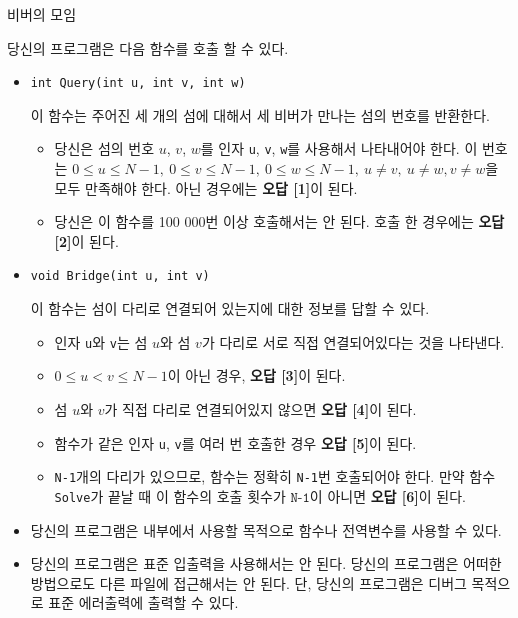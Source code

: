 \begin{problem}{비버의 모임}
\begin{itemize}
		당신의 프로그램은 다음 함수를 호출 할 수 있다.
		\begin{itemize}
			\item \texttt{int Query(int u, int v, int w)}
			
			이 함수는 주어진 세 개의 섬에 대해서 세 비버가 만나는 섬의 번호를 반환한다.
			
			\begin{itemize}
				\item 당신은 섬의 번호 $u$, $v$, $w$를 인자 \texttt{u}, \texttt{v}, \texttt{w}를 사용해서 나타내어야 한다. 이 번호는 $0 \le u \le N-1,\ 0 \le v \le N-1, \ 0 \le w \le N-1, \ u \ne v, \ u \ne w , v \ne w$을 모두 만족해야 한다. 아닌 경우에는 \textbf{오답 [1]}이 된다.
				
				\item 당신은 이 함수를 100 000번 이상 호출해서는 안 된다. 호출 한 경우에는 \textbf{오답 [2]}이 된다.
			\end{itemize}
		
			\item \texttt{void Bridge(int u, int v)}
			
			이 함수는 섬이 다리로 연결되어 있는지에 대한 정보를 답할 수 있다.
			
			\begin{itemize}
				\item 인자 \texttt{u}와 \texttt{v}는 섬 $u$와 섬 $v$가 다리로 서로 직접 연결되어있다는 것을 나타낸다.
				\item $0 \le u < v \le N-1$이 아닌 경우, \textbf{오답 [3]}이 된다.
				\item 섬 $u$와 $v$가 직접 다리로 연결되어있지 않으면 \textbf{오답 [4]}이 된다.
				\item 함수가 같은 인자 \texttt{u}, \texttt{v}를 여러 번 호출한 경우 \textbf{오답 [5]}이 된다.
				\item \texttt{N-1}개의 다리가 있으므로, 함수는 정확히 \texttt{N-1}번 호출되어야 한다. 만약 함수 \texttt{Solve}가 끝날 때 이 함수의 호출 횟수가 $\texttt{N-1}$이 아니면 \textbf{오답 [6]}이 된다.
			\end{itemize}
		\end{itemize}
	
	
	\end{itemize}

	\Notes

	\begin{itemize}
		\item 당신의 프로그램은 내부에서 사용할 목적으로 함수나 전역변수를 사용할 수 있다.
		\item 당신의 프로그램은 표준 입출력을 사용해서는 안 된다. 당신의 프로그램은 어떠한 방법으로도 다른 파일에 접근해서는 안 된다. 단, 당신의 프로그램은 디버그 목적으로 표준 에러출력에 출력할 수 있다.
	\end{itemize}


\end{problem}
